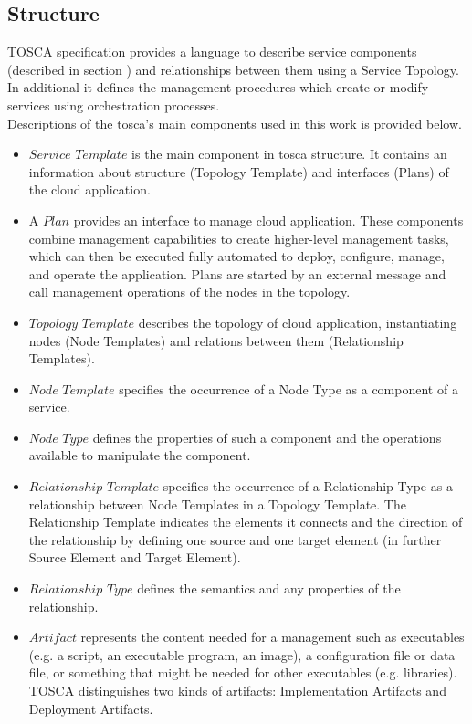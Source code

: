 \subsection*{Structure}
TOSCA specification provides a language to describe service components (described in section ) and relationships between them using a Service Topology. 
In additional it defines the management procedures which create or modify services using orchestration processes.\\
Descriptions of the \gls{tosca}'s main components used in this work is provided below.
\begin{itemize}
\item $Service$ $Template$ is the main component in \gls{tosca} structure. 
It contains an information about structure (Topology Template) and interfaces (Plans) of the cloud application.
\item A $Plan$ provides an interface to manage cloud application.
These components combine management capabilities to create higher-level management tasks, which can then be executed fully automated to deploy, configure, manage, and operate the application.
Plans are started by an external message and call management operations of the nodes in the topology.
\item $Topology$ $Template$ describes the topology of cloud application, instantiating nodes (Node Templates) and relations between them (Relationship Templates).
\item $Node$ $Template$ specifies the occurrence of a Node Type as a component of a service.
\item $Node$ $Type$ defines the properties of such a component and the operations available to manipulate the component.
\item $Relationship$ $Template$ specifies the occurrence of a Relationship Type as a relationship between Node Templates in a Topology Template. 
	The Relationship Template indicates the elements it connects and the direction of the relationship by defining one source and one target element (in further Source Element and Target Element).
\item $Relationship$ $Type$ defines the semantics and any properties of the relationship. \label{subs:reltype}
\item $Artifact$ represents the content needed for a management such as executables (e.g. a script, an executable program, an image), a configuration file or data file, or something that might be needed for other executables (e.g. libraries).
	TOSCA distinguishes two kinds of artifacts: Implementation Artifacts and Deployment Artifacts.

\end{itemize}
